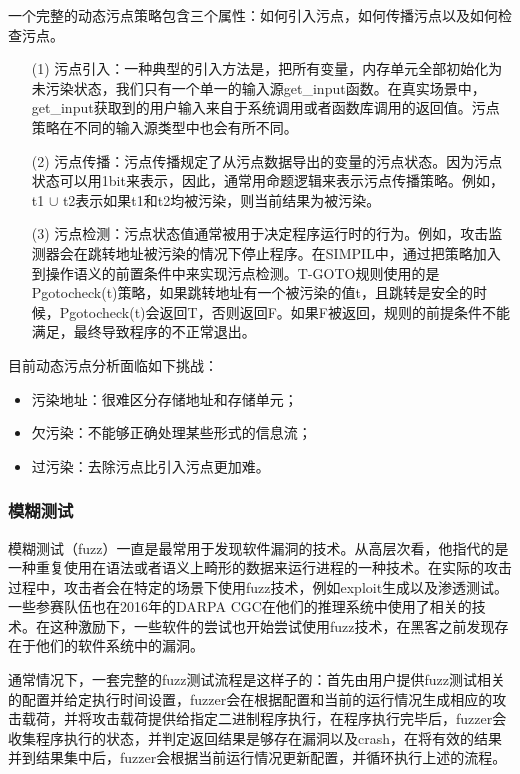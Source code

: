 \documentclass[doctor,privacy,twoside]{buaa_mac}
\begin{document}
一个完整的动态污点策略包含三个属性：如何引入污点，如何传播污点以及如何检查污点。
\begin{itemize}
\item[(1)] 污点引入：一种典型的引入方法是，把所有变量，内存单元全部初始化为未污染状态，我们只有一个单一的输入源get\_{}input函数。在真实场景中，get\_{}input获取到的用户输入来自于系统调用或者函数库调用的返回值。污点策略在不同的输入源类型中也会有所不同。
\item[(2)] 污点传播：污点传播规定了从污点数据导出的变量的污点状态。因为污点状态可以用1bit来表示，因此，通常用命题逻辑来表示污点传播策略。例如，t1 $\cup$ t2表示如果t1和t2均被污染，则当前结果为被污染。
\item[(3)] 污点检测：污点状态值通常被用于决定程序运行时的行为。例如，攻击监测器会在跳转地址被污染的情况下停止程序。在SIMPIL中，通过把策略加入到操作语义的前置条件中来实现污点检测。T-GOTO规则使用的是Pgotocheck(t)策略，如果跳转地址有一个被污染的值t，且跳转是安全的时候，Pgotocheck(t)会返回T，否则返回F。如果F被返回，规则的前提条件不能满足，最终导致程序的不正常退出。
\end{itemize}

目前动态污点分析面临如下挑战：
\begin{itemize}
\item 污染地址：很难区分存储地址和存储单元；
\item 欠污染：不能够正确处理某些形式的信息流；
\item 过污染：去除污点比引入污点更加难。
\end{itemize}


\subsubsection{模糊测试}

模糊测试（fuzz）一直是最常用于发现软件漏洞的技术。从高层次看，他指代的是一种重复使用在语法或者语义上畸形的数据来运行进程的一种技术。在实际的攻击过程中，攻击者会在特定的场景下使用fuzz技术，例如exploit生成以及渗透测试。一些参赛队伍也在2016年的DARPA CGC在他们的推理系统中使用了相关的技术。在这种激励下，一些软件的尝试也开始尝试使用fuzz技术，在黑客之前发现存在于他们的软件系统中的漏洞。

通常情况下，一套完整的fuzz测试流程是这样子的：首先由用户提供fuzz测试相关的配置并给定执行时间设置，fuzzer会在根据配置和当前的运行情况生成相应的攻击载荷，并将攻击载荷提供给指定二进制程序执行，在程序执行完毕后，fuzzer会收集程序执行的状态，并判定返回结果是够存在漏洞以及crash，在将有效的结果并到结果集中后，fuzzer会根据当前运行情况更新配置，并循环执行上述的流程。
\end{document}
